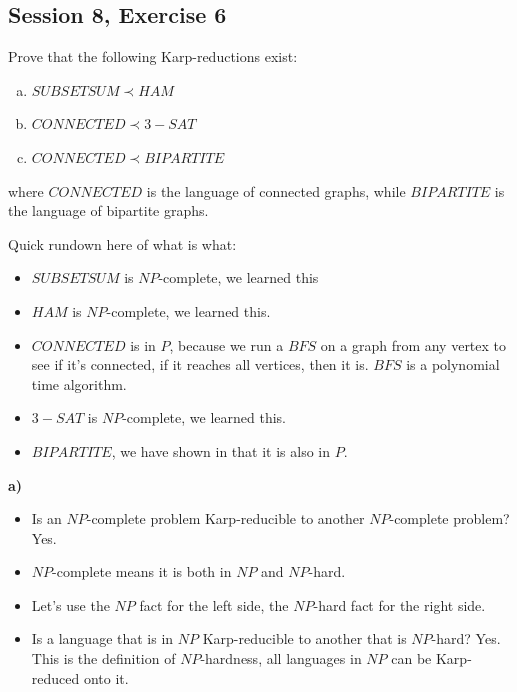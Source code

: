 \subsection {Session 8, Exercise 6}
\label{8f6}


Prove that the following Karp-reductions exist:

\begin{enumerate}[a)]
    \item $SUBSETSUM \prec HAM$
    \item $CONNECTED \prec 3-SAT$
    \item $CONNECTED \prec BIPARTITE$
\end{enumerate}

where $CONNECTED$ is the language of connected graphs, while $BIPARTITE$ is the language of bipartite graphs.


Quick rundown here of what is what:

\begin{itemize}
    \item $SUBSETSUM$ is $NP$-complete, we learned this
    \item $HAM$ is $NP$-complete, we learned this.
    \item $CONNECTED$ is in $P$, because we run a $BFS$ on a graph from any vertex to see if it's connected, if it reaches all vertices, then it is. $BFS$ is a polynomial time algorithm.
    \item $3-SAT$ is $NP$-complete, we learned this.
    \item $BIPARTITE$, we have shown in  that it is also in $P$.
\end{itemize}

\textbf{a)}

\begin{itemize}
    \item Is an $NP$-complete problem Karp-reducible to another $NP$-complete problem? Yes.
    \item $NP$-complete means it is both in $NP$ and $NP$-hard.
    \item Let's use the $NP$ fact for the left side, the $NP$-hard fact for the right side.
    \item Is a language that is in $NP$ Karp-reducible to another that is $NP$-hard? Yes. This is the definition of $NP$-hardness, all languages in $NP$ can be Karp-reduced onto it.
\end{itemize}

